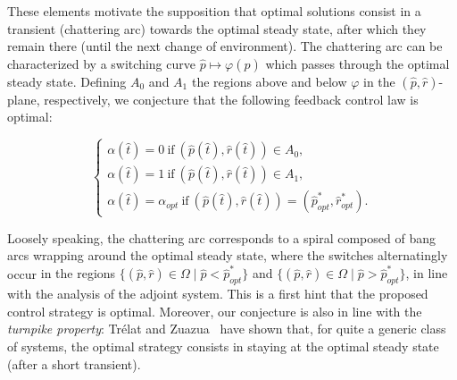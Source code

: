 \documentclass[a4paper,12pt]{article}
\newcommand{\tr}[1]{{#1}}
\begin{document}
These elements motivate the supposition that optimal solutions consist in a transient (chattering arc) towards the optimal steady state, after which they remain there (until the next change of environment). The chattering arc can be characterized by a switching curve $\hat{p}\mapsto\varphi(\hat{p})$ which passes through the optimal steady state.
Defining $A_0$ and $A_1$ the regions above and below $\varphi$ in the $(\hat{p},\hat{r})$-plane, respectively, we conjecture that the following feedback control law is optimal: 


\begin{equation}\label{control-opt}
\begin{cases}
\alpha(\hat{t})=0 \ \textrm{if} \ (\hat{p}(\hat{t}),\hat{r}(\hat{t}))\in A_0,\\
\alpha(\hat{t})=1 \ \textrm{if} \ (\hat{p}(\hat{t}),\hat{r}(\hat{t}))\in A_1,\\
\alpha(\hat{t})=\alpha_{opt} \ \textrm{if} \ (\hat{p}(\hat{t}),\hat{r}(\hat{t}))=(\hat{p}_{opt}^*,\hat{r}_{opt}^*).
\end{cases}
\end{equation}


\tr{Loosely speaking, the chattering arc corresponds to a spiral composed of bang arcs wrapping around the optimal steady state,} \tr{where the switches alternatingly occur} \tr{in the regions  $\{(\hat{p},\hat{r})\in \Omega \mid \hat{p}<\hat{p}_{opt}^*\}$ and $\{(\hat{p},\hat{r})\in \Omega \mid \hat{p}>\hat{p}_{opt}^*\}$, in line with the analysis of the adjoint system.}
This is a first hint that the proposed control strategy is optimal. Moreover, our conjecture is also in line with the \textit{turnpike property}:
Trélat and Zuazua~\cite{trelat_turnpike_2015} have shown that, for quite a generic class of systems, the optimal strategy consists in staying at the optimal steady state (after a short transient).
\end{document}
